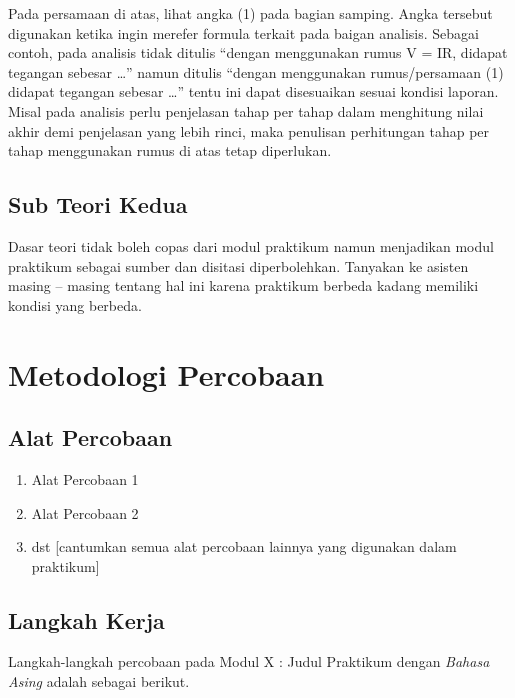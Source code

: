 \documentclass[conference]{IEEEtran}
\begin{document}
Pada persamaan di atas, lihat angka (1) pada bagian samping. Angka tersebut digunakan ketika ingin merefer formula terkait pada baigan analisis. Sebagai contoh, pada analisis tidak ditulis “dengan menggunakan rumus V = IR, didapat tegangan sebesar …” namun ditulis “dengan menggunakan rumus/persamaan (1) didapat tegangan sebesar …” tentu ini dapat disesuaikan sesuai kondisi laporan. Misal pada analisis perlu penjelasan tahap per tahap dalam menghitung nilai akhir demi penjelasan yang lebih rinci, maka penulisan perhitungan tahap per tahap menggunakan rumus di atas tetap diperlukan.

\subsection{Sub Teori Kedua}

Dasar teori tidak boleh copas dari modul praktikum namun menjadikan modul praktikum sebagai sumber dan disitasi diperbolehkan. Tanyakan ke asisten masing – masing tentang hal ini karena praktikum berbeda kadang memiliki kondisi yang berbeda.

\section{Metodologi Percobaan}

\subsection{Alat Percobaan}
\begin{enumerate}[1., leftmargin=1cm]
    \item Alat Percobaan 1
    \item Alat Percobaan 2
    \item dst [cantumkan semua alat percobaan lainnya yang digunakan dalam praktikum] 
\end{enumerate}

\subsection{Langkah Kerja}
Langkah-langkah percobaan pada Modul X : Judul Praktikum dengan \textit{Bahasa Asing} adalah sebagai berikut.
\end{document}
